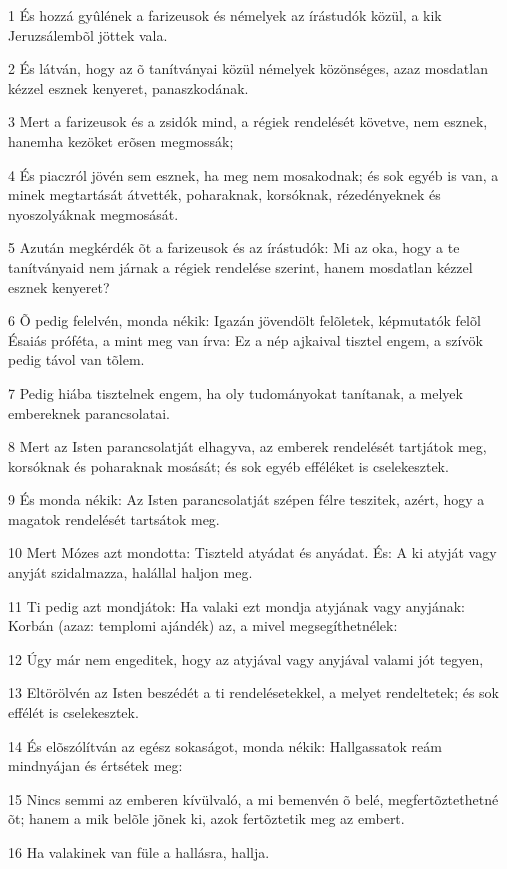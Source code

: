 \par 1 És hozzá gyûlének a farizeusok és némelyek az írástudók közül, a kik Jeruzsálembõl jöttek vala.
\par 2 És látván, hogy az õ tanítványai közül némelyek közönséges, azaz mosdatlan kézzel esznek kenyeret, panaszkodának.
\par 3 Mert a farizeusok és a zsidók mind, a régiek rendelését követve, nem esznek, hanemha kezöket erõsen megmossák;
\par 4 És piaczról jövén sem esznek, ha meg nem mosakodnak; és sok egyéb is van, a minek megtartását átvették, poharaknak, korsóknak, rézedényeknek és nyoszolyáknak megmosását.
\par 5 Azután megkérdék õt a farizeusok és az írástudók: Mi az oka, hogy a te tanítványaid nem járnak a régiek rendelése szerint, hanem mosdatlan kézzel esznek kenyeret?
\par 6 Õ pedig felelvén, monda nékik: Igazán jövendölt felõletek, képmutatók felõl Ésaiás próféta, a mint meg van írva: Ez a nép ajkaival tisztel engem, a szívök pedig távol van tõlem.
\par 7 Pedig hiába tisztelnek engem, ha oly tudományokat tanítanak, a melyek embereknek parancsolatai.
\par 8 Mert az Isten parancsolatját elhagyva, az emberek rendelését tartjátok meg, korsóknak és poharaknak mosását; és sok egyéb efféléket is cselekesztek.
\par 9 És monda nékik: Az Isten parancsolatját szépen félre teszitek, azért, hogy a magatok rendelését tartsátok meg.
\par 10 Mert Mózes azt mondotta: Tiszteld atyádat és anyádat. És: A ki atyját vagy anyját szidalmazza, halállal haljon meg.
\par 11 Ti pedig azt mondjátok: Ha valaki ezt mondja atyjának vagy anyjának: Korbán (azaz: templomi ajándék) az, a mivel megsegíthetnélek:
\par 12 Úgy már nem engeditek, hogy az atyjával vagy anyjával valami jót tegyen,
\par 13 Eltörölvén az Isten beszédét a ti rendelésetekkel, a melyet rendeltetek; és sok effélét is cselekesztek.
\par 14 És elõszólítván az egész sokaságot, monda nékik: Hallgassatok reám mindnyájan és értsétek meg:
\par 15 Nincs semmi az emberen kívülvaló, a mi bemenvén õ belé, megfertõztethetné õt; hanem a mik belõle jõnek ki, azok fertõztetik meg az embert.
\par 16 Ha valakinek van füle a hallásra, hallja.
